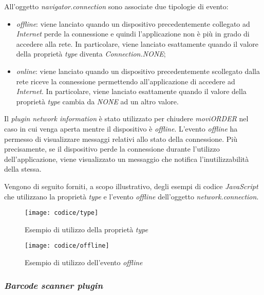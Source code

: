\hspace{-15pt}All'oggetto \textit{navigator.connection} sono associate due tipologie di evento:
\begin{itemize}
	\item \textit{offline}: viene lanciato quando un dispositivo precedentemente collegato ad \textit{Internet} perde la connessione e quindi l'applicazione non è più in grado di accedere alla rete. In particolare, viene lanciato esattamente quando il valore della proprietà \textit{type} diventa \textit{Connection.NONE};
	\item \textit{online}: viene lanciato quando un dispositivo precedentemente scollegato dalla rete riceve la connessione permettendo all'applicazione di accedere ad \textit{Internet}. In particolare, viene lanciato esattamente quando il valore della proprietà \textit{type} cambia da \textit{NONE} ad un altro valore.
\end{itemize}
Il \textit{plugin} \textit{network information} è stato utilizzato per chiudere \textit{moviORDER} nel caso in cui venga aperta mentre il dispositivo è \textit{offline}. L'evento \textit{offline} ha permesso di visualizzare messaggi relativi allo stato della connessione. Più precisamente, se il dispositivo perde la connessione durante l'utilizzo dell'applicazione, viene visualizzato un messaggio che notifica l'inutilizzabilità della stessa.

Vengono di seguito forniti, a scopo illustrativo, degli esempi di codice \textit{JavaScript} che utilizzano la proprietà \textit{type} e l'evento \textit{offline} dell'oggetto \textit{network.connection}.

\begin{figure}[!h] 
    \centering 
    \texttt{[image: codice/type]} 
    \caption{Esempio di utilizzo della proprietà \textit{type}}
\end{figure}

\begin{figure}[!h] 
    \centering 
    \texttt{[image: codice/offline]} 
    \caption{Esempio di utilizzo dell'evento \textit{offline}}
\end{figure}

\subsubsection{\textit{Barcode scanner plugin}}

